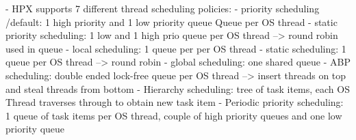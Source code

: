   \cite{hpxMP.2019}
  \cite{TheSTEARGroup.2020}
    - HPX supports 7 different thread scheduling policies:
      - priority scheduling /default: 1 high priority and 1 low priority queue Queue per OS thread
      - static priority scheduling: 1 low and 1 high prio queue per OS thread --> round robin used in queue
      - local scheduling: 1 queue per per OS thread
      - static scheduling: 1 queue per OS thread --> round robin
      - global scheduling: one shared queue
      - ABP scheduling: double ended lock-free queue per OS thread --> insert threads on top and steal threads from bottom
      - Hierarchy scheduling: tree of task items, each OS Thread traverses through to obtain new task item
      - Periodic priority scheduling: 1 queue of task items per OS thread, couple of high priority queues and one low priority queue
      